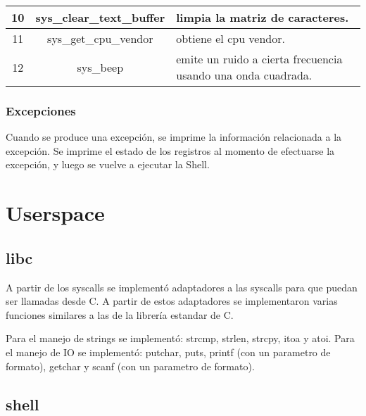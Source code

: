 \documentclass{article}
\begin{document}
\begin{center}
\begin{tabular}{|c|c|l|}
10 & sys\_clear\_text\_buffer &  \begin{minipage}{80mm}limpia la matriz de caracteres.\end{minipage} \\ \hline
11 & sys\_get\_cpu\_vendor &  \begin{minipage}{80mm}obtiene el cpu vendor. \end{minipage} \\ \hline
12 & sys\_beep &  \begin{minipage}{80mm}emite un ruido a cierta frecuencia usando una onda cuadrada.\end{minipage} \\ \hline
\end{tabular}
\label{table:syscalls}
\end{center}

\subsubsection {Excepciones}

Cuando se produce una excepción, se imprime la información relacionada a la excepción. Se imprime el estado de los registros al momento de efectuarse la excepción, y luego se vuelve a ejecutar la Shell.

\section {Userspace}

\subsection {libc}

A partir de los syscalls se implementó adaptadores a las syscalls para que puedan ser llamadas desde C. A partir de estos adaptadores se implementaron varias funciones similares a las de la librería estandar de C.

Para el manejo de strings se implementó: strcmp, strlen, strcpy, itoa y atoi.
Para el manejo de IO se implementó: putchar, puts, printf (con un parametro de formato), getchar y scanf (con un parametro de formato).

\subsection {shell}
\end{document}
